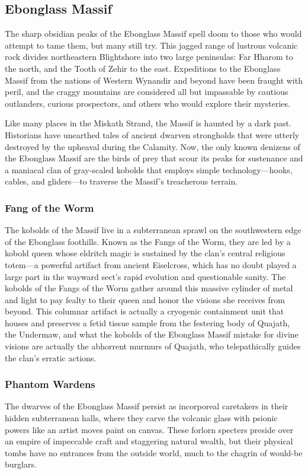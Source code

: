 \documentclass[10pt,a4paper,twoside,bg=print,twocolumn,openany,nodeprecatedcode]{dndbook}
\begin{document}
\subsection{Ebonglass Massif}
The sharp obsidian peaks of the Ebonglass Massif spell doom to those who would attempt to tame them, but many still try. This jagged range of lustrous volcanic rock divides northeastern Blightshore into two large peninsulas: Far Hharom to the north, and the Tooth of Zehir to the east. Expeditions to the Ebonglass Massif from the nations of Western Wynandir and beyond have been fraught with peril, and the craggy mountains are considered all but impassable by cautious outlanders, curious prospectors, and others who would explore their mysteries.

Like many places in the Miskath Strand, the Massif is haunted by a dark past. Historians have unearthed tales of ancient dwarven strongholds that were utterly destroyed by the upheaval during the Calamity. Now, the only known denizens of the Ebonglass Massif are the birds of prey that scour its peaks for sustenance and a maniacal clan of gray-scaled kobolds that employs simple technology—hooks, cables, and gliders—to traverse the Massif's treacherous terrain.

\subsubsection{Fang of the Worm}
The kobolds of the Massif live in a subterranean sprawl on the southwestern edge of the Ebonglass foothills. Known as the Fangs of the Worm, they are led by a kobold queen whose eldritch magic is sustained by the clan's central religious totem—a powerful artifact from ancient Eiselcross, which has no doubt played a large part in the wayward sect's rapid evolution and questionable sanity. The kobolds of the Fangs of the Worm gather around this massive cylinder of metal and light to pay fealty to their queen and honor the visions she receives from beyond. This columnar artifact is actually a cryogenic containment unit that houses and preserves a fetid tissue sample from the festering body of Quajath, the Undermaw, and what the kobolds of the Ebonglass Massif mistake for divine visions are actually the abhorrent murmurs of Quajath, who telepathically guides the clan's erratic actions.

\subsubsection{Phantom Wardens}
The dwarves of the Ebonglass Massif persist as incorporeal caretakers in their hidden subterranean halls, where they carve the volcanic glass with psionic powers like an artist moves paint on canvas. These forlorn specters preside over an empire of impeccable craft and staggering natural wealth, but their physical tombs have no entrances from the outside world, much to the chagrin of would-be burglars.
\end{document}
